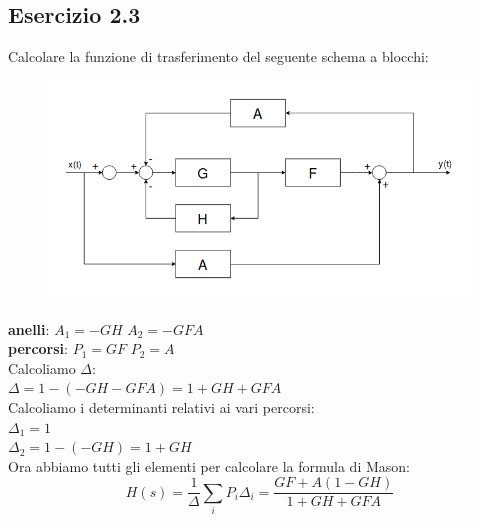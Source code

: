 \documentclass[12pt,a4paper]{article}
\begin{document}
 	\subsection*{Esercizio 2.3} Calcolare la funzione di trasferimento del seguente schema a blocchi:
 	\begin{figure}[h!]
 		\centering
 		\includegraphics[scale=0.5]{./images/schema23.png}
 	\end{figure}

 	\hspace{-18px}\textbf{anelli}: $A_1 = -GH$ \quad $A_2 = -GFA$\\
 	\textbf{percorsi}: $P_1 = GF$ \quad $P_2 = A$ \\

 	\hspace{-18px}Calcoliamo $\Delta$:\\
 	$\Delta = 1 - (-GH-GFA) = 1 + GH + GFA$\\


 	\hspace{-18px}Calcoliamo i determinanti relativi ai vari percorsi:\\
 	$\Delta_1 = 1$\\
 	$\Delta_2 = 1-(-GH) = 1 + GH$\\

 	\hspace{-18px}Ora abbiamo tutti gli elementi per calcolare la formula di Mason:
 	\[
 		H(s) = \frac{1}{\Delta}\sum_i P_i \Delta_i = \frac{GF + A(1-GH)}{1+GH+GFA}
 	\]
	\newpage
\end{document}
